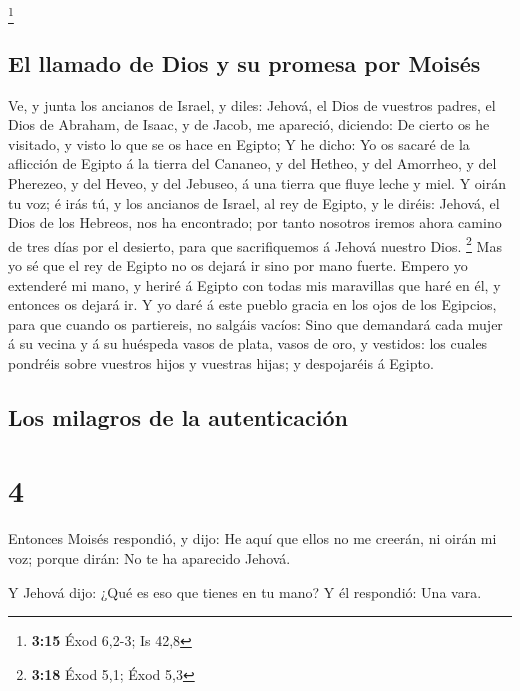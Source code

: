 \footnote{\textbf{3:15} Éxod 6,2-3; Is 42,8}

\hypertarget{el-llamado-de-dios-y-su-promesa-por-moisuxe9s}{%
\subsection{El llamado de Dios y su promesa por
Moisés}\label{el-llamado-de-dios-y-su-promesa-por-moisuxe9s}}

 Ve, y junta los ancianos de Israel, y diles: Jehová, el
Dios de vuestros padres, el Dios de Abraham, de Isaac, y de Jacob, me
apareció, diciendo: De cierto os he visitado, y visto lo que se os hace
en Egipto;  Y he dicho: Yo os sacaré de la aflicción de
Egipto á la tierra del Cananeo, y del Hetheo, y del Amorrheo, y del
Pherezeo, y del Heveo, y del Jebuseo, á una tierra que fluye leche y
miel.  Y oirán tu voz; é irás tú, y los ancianos de Israel,
al rey de Egipto, y le diréis: Jehová, el Dios de los Hebreos, nos ha
encontrado; por tanto nosotros iremos ahora camino de tres días por el
desierto, para que sacrifiquemos á Jehová nuestro Dios. \footnote{\textbf{3:18}
  Éxod 5,1; Éxod 5,3}  Mas yo sé que el rey de Egipto no os
dejará ir sino por mano fuerte.  Empero yo extenderé mi
mano, y heriré á Egipto con todas mis maravillas que haré en él, y
entonces os dejará ir.  Y yo daré á este pueblo gracia en
los ojos de los Egipcios, para que cuando os partiereis, no salgáis
vacíos:  Sino que demandará cada mujer á su vecina y á su
huéspeda vasos de plata, vasos de oro, y vestidos: los cuales pondréis
sobre vuestros hijos y vuestras hijas; y despojaréis á Egipto.

\hypertarget{los-milagros-de-la-autenticaciuxf3n}{%
\subsection{Los milagros de la
autenticación}\label{los-milagros-de-la-autenticaciuxf3n}}

\hypertarget{section-3}{%
\section{4}\label{section-3}}

 Entonces Moisés respondió, y dijo: He aquí que ellos no me
creerán, ni oirán mi voz; porque dirán: No te ha aparecido Jehová.

 Y Jehová dijo: ¿Qué es eso que tienes en tu mano? Y él
respondió: Una vara.

